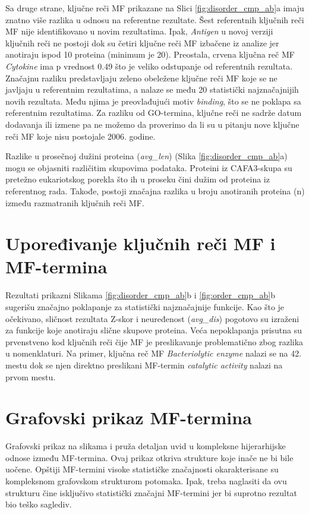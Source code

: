 Sa druge strane,  ključne reči MF prikazane na
Slici \ref{fig:disorder_cmp_ab}a imaju znatno više razlika u odnosu na
referentne rezultate.  Šest referentnih ključnih reči MF nije identifikovano u
novim rezultatima. Ipak, \textit{Antigen} u novoj verziji ključnih reči ne
postoji dok su četiri ključne reči MF izbačene iz analize jer anotiraju ispod 10
proteina (minimum je 20).  Preostala, crvena ključna reč MF
\textit{Cytokine} ima p vrednost 0.49 što je veliko odstupanje od referentnih
rezultata. Značajnu razliku predstavljaju zeleno obeležene ključne reči MF koje
se ne javljaju u referentnim rezultatima, a nalaze se među 20 statistički
najznačajnijih novih rezultata. Među njima je preovlađujući motiv \textit{binding}, 
što se ne poklapa sa referentnim rezultatima. Za razliku od GO-termina,
ključne reči ne sadrže datum dodavanja ili izmene pa ne možemo da proverimo da
li su u pitanju nove ključne reči MF koje nisu postojale 2006. godine.

Razlike u prosečnoj dužini proteina (\textit{avg\_len}) (Slika
\ref{fig:disorder_cmp_ab}a) mogu se objasniti različitim skupovima podataka.
Proteini iz CAFA3-skupa su pretežno eukariotskog porekla što ih u proseku čini
dužim od proteina iz referentnog rada. Takođe, postoji značajna razlika u broju
anotiranih proteina (n) između razmatranih ključnih reči MF.


\section{Upoređivanje ključnih reči MF i MF-termina}

Rezultati prikazni Slikama \ref{fig:disorder_cmp_ab}b i
\ref{fig:order_cmp_ab}b sugerišu značajno poklapanje za statistički
najznačajnije funkcije. Kao što je očekivano, sličnost rezultata Z-skor i
neuređenost (\textit{avg\_dis}) pogotovo su izraženi za funkcije koje anotiraju
slične skupove proteina. Veća nepoklapanja prisutna su prvenstveno kod ključnih
reči čije MF je preslikavanje problematično zbog razlika u nomenklaturi. Na primer,
ključna reč MF \textit{Bacteriolytic enzyme} nalazi se na 42. mestu dok se njen
direktno preslikani MF-termin \textit{catalytic activity} nalazi na prvom mestu.

\section{Grafovski prikaz MF-termina}

Grafovski prikaz na slikama  i  pruža
detaljan uvid u kompleksne hijerarhijske odnose između MF-termina. Ovaj prikaz otkriva
strukture koje inače ne bi bile uočene.  Opštiji MF-termini visoke statističke
značajnosti okarakterisane su kompleksnom grafovskom strukturom potomaka. Ipak,
treba naglasiti da ovu strukturu čine isključivo statistički značajni MF-termini
jer bi suprotno rezultat bio  teško saglediv.

